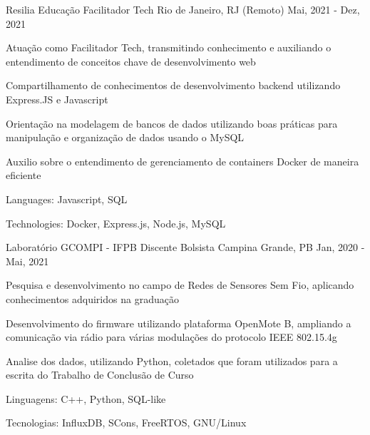 \begin{cventries}

  \cventry
  {Resilia Educação} %
  {Facilitador Tech} %
  {Rio de Janeiro, RJ (Remoto)} %
  {Mai, 2021 - Dez, 2021} %
  {
    \begin{cvitems} %
      \item {Atuação como Facilitador Tech, transmitindo conhecimento e auxiliando o entendimento de conceitos chave de desenvolvimento web}
      \item {Compartilhamento de conhecimentos de desenvolvimento backend utilizando Express.JS e Javascript}
      \item {Orientação na modelagem de bancos de dados utilizando boas práticas para manipulação e organização de dados usando o MySQL}
      \item {Auxilio sobre o entendimento de gerenciamento de containers Docker de maneira eficiente}
      \item {Languages: Javascript, SQL}
      \item {Technologies: Docker, Express.js, Node.js, MySQL}
    \end{cvitems}
  }

  \cventry
  {Laboratório GCOMPI - IFPB} %
  {Discente Bolsista} %
  {Campina Grande, PB} %
  {Jan, 2020 - Mai, 2021} %
  {
    \begin{cvitems} %
      \item {Pesquisa e desenvolvimento no campo de Redes de Sensores Sem Fio, aplicando conhecimentos adquiridos na graduação}
      \item {Desenvolvimento do firmware utilizando plataforma OpenMote B, ampliando a comunicação via rádio para várias modulações do protocolo IEEE 802.15.4g}
      \item {Analise dos dados, utilizando Python, coletados que foram utilizados para a escrita do Trabalho de Conclusão de Curso}
      \item {Linguagens: C++, Python, SQL-like}
      \item {Tecnologias: InfluxDB, SCons, FreeRTOS, GNU/Linux}
    \end{cvitems}
  }
\end{cventries}
